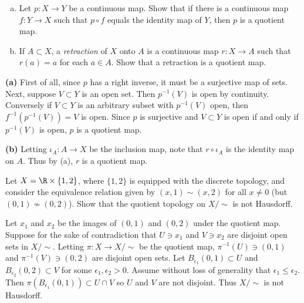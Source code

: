 \documentclass[11pt,letterpaper]{article}
\begin{document}
\begin{problem}\noindent
    \begin{enumerate}[(a)]
        \item Let $p : X \to Y$ be a continuous map. Show that if there is a continuous map $f : Y \to X$ such that $p\circ f$ equals the identity map of $Y$, then $p$ is a quotient map.
        \item If $A\subset X$, a \emph{retraction} of $X$ onto $A$ is a continuous map $r : X \to A$ such that $r(a)=a$ for each $a\in A$. Show that a retraction is a quotient map.
    \end{enumerate}
\end{problem}

\begin{solution}
    \textbf{(a)} First of all, since $p$ has a right inverse, it must be a surjective map of sets. Next, suppose $V\subset Y$ is an open set. Then $p^{-1}(V)$ is open by continuity. Conversely if $V\subset Y$ is an arbitrary subset with $p^{-1}(V)$ open, then $f^{-1}(p^{-1}(V))=V$ is open. Since $p$ is surjective and $V\subset Y$ is open if and only if $p^{-1}(V)$ is open, $p$ is a quotient map.

    \textbf{(b)} Letting $\iota_A : A \to X$ be the inclusion map, note that $r\circ \iota_A$ is the identity map on $A$. Thus by (a), $r$ is a quotient map. 
\end{solution}

\begin{problem}
    Let $X=\R\times \{1,2\}$, where $\{1,2\}$ is equipped with the discrete topology, and consider the equivalence relation given by $(x,1)\sim (x,2)$ for all $x\neq 0$ (but $(0,1)\not\sim (0,2)$). Show that the quotient topology on $X/\sim$ is not Hausdorff.
\end{problem}

\begin{solution}
    Let $x_1$ and $x_2$ be the images of $(0,1)$ and $(0,2)$ under the quotient map. Suppose for the sake of contradiction that $U\ni x_1$ and $V\ni x_2$ are disjoint open sets in $X /\sim$. Letting $\pi : X \to X /\sim$ be the quotient map, $\pi^{-1}(U)\ni (0,1)$ and $\pi^{-1}(V)\ni (0,2)$ are disjoint open sets. Let $B_{\epsilon_1}(0,1)\subset U$ and $B_{\epsilon_2}(0,2)\subset V$ for some $\epsilon_1,\epsilon_2>0$. Assume without loss of generality that $\epsilon_1\leq \epsilon_2$. Then $\pi(B_{\epsilon_1}(0,1))\subset U\cap V$ so $U$ and $V$ are not disjoint. Thus $X/\sim$ is not Hausdorff.
\end{solution}
\end{document}
